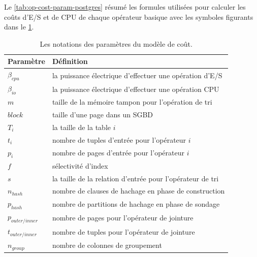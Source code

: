 Le \ref{tab:op-cost-param-postgres} résumé les formules utilisées pour calculer les coûts  d'E/S et de CPU de chaque opérateur basique avec les symboles figurants dans le \ref{tab:cost-param-postgres}.

\begin{table}
\centering
\caption{Les notations des paramètres du modèle de coût.}\label{tab:cost-param-postgres}
\begin{tabular}{ll}
    \toprule
    \textbf{Paramètre} & \textbf{Définition} \\ \midrule
    $\beta_{cpu}$ & la puissance électrique d'effectuer une opération d'E/S \\
    $\beta_{io}$ & la puissance électrique d'effectuer une opération CPU \\
    \midrule
	$m$ & taille de la mémoire tampon pour l'opération de tri \\
	$block$ & taille d'une page dans un SGBD \\
	$T_i$ & la taille de la table $i$ \\
	\midrule
    $t_i$ & nombre de tuples d'entrée pour l'opérateur $i$ \\
    $p_i$ & nombre de pages d'entrée pour l'opérateur $i$ \\
    $f$ & sélectivité d'index \\
    $s$ & la taille de la relation d'entrée pour l'opérateur de tri \\
    $n_{hash}$ & nombre de clauses de hachage en phase de construction \\
    $p_{hash}$ & nombre de partitions de hachage en phase de sondage \\
    $p_{outer/inner}$ & nombre de pages pour l'opérateur de jointure \\
    $t_{outer/inner}$ & nombre de tuples pour l'opérateur de jointure \\
    $n_{group}$ & nombre de colonnes de groupement \\
    \bottomrule
    \end{tabular}
\end{table}
